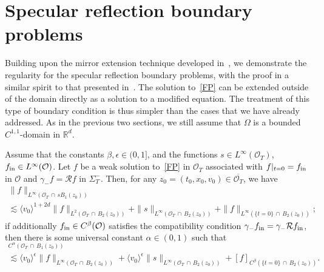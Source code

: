 \documentclass[AHL,Unicode,longabstracts,published]{cedram}
\newcommand*\fin {f_{\rm in}}
\newcommand*\R {\mathbb{R}}
\newcommand*\RR {\mathcal{R}}
\newcommand*\OO {\mathcal{O}}
\newcommand{\lvv}{\langle v_0\rangle}
\begin{document}
\section{Specular reflection boundary problems}\label{specular}
Building upon the mirror extension technique developed in~\cite{GHJO,Nier}, we demonstrate the regularity for the specular reflection boundary problems, with the proof in a similar spirit to that presented in~\cite{GHJO}. The solution to~\eqref{FP} can be extended outside of the domain directly as a solution to a modified equation. The treatment of this type of boundary condition is thus simpler than the cases that we have already addressed. As in the previous two sections, we still assume that $\Omega$ is a bounded $C^{1,1}$-domain in $\R^d$.

\begin{prop}\label{locals}
Assume that the constants $\beta,\epsilon\in(0,1]$, and the functions $s\in L^\infty(\OO_T)$, $\fin\in L^\infty(\OO)$. Let $f$ be a weak solution to~\eqref{FP} in $\OO_T$ associated with $f|_{t=0}=\fin$ in $\OO$ and $\gamma_-f=\RR f$ in $\Sigma_T^-$. Then, for any $z_0=(t_0,x_0,v_0)\in\overline{\OO_T}$, we have
\begin{multline*}
\|f\|_{L^\infty\left({\OO_T}\,\cap\,sB_1(z_0)\right)}\\
\lesssim \lvv^{1+2d}\|f\|_{L^2\left({\OO_T}\,\cap \,B_2(z_0)\right)}
+\|s\|_{L^\infty\left({\OO_T}\,\cap\,B_2(z_0)\right)} +\|f\|_{L^\infty\left(\{t=0\}\,\cap \,B_2(z_0)\right)};
\end{multline*}
if additionally $\fin\in C^\beta(\OO)$ satisfies the compatibility condition $\gamma_-\fin=\gamma_-\RR\fin$, then there is some universal constant $\alpha\in(0,1)$ such that
\begin{multline*}
 [f]_{C^\alpha\left({\OO_T}\,\cap\,B_{1}(z_0)\right)}\\
\lesssim \lvv^{\epsilon}\|f\|_{L^\infty\left({\OO_T}\,\cap \,B_{2}(z_0)\right)} 
+\lvv^{\epsilon}\|s\|_{L^\infty\left({\OO_T}\,\cap\,B_{2}(z_0)\right)} + [f]_{C^\beta\left(\{t=0\}\,\cap\,B_{2}(z_0)\right)}.
\end{multline*}
\end{prop}
\end{document}
